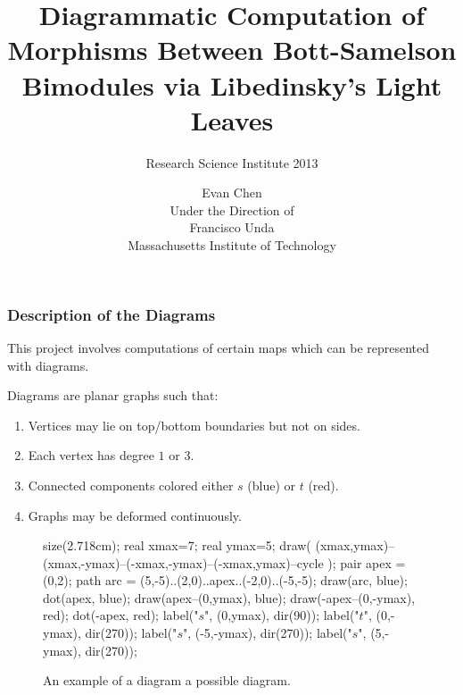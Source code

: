 \documentclass[pdf]{beamer}
\title[Maps in $\mathcal B_{\text{BS}}$]{Diagrammatic Computation of Morphisms Between Bott-Samelson Bimodules via Libedinsky's Light Leaves}
\subtitle[RSI 2013]{Research Science Institute 2013}
\author[Evan Chen]{Evan Chen \\ Under the Direction of \\ Francisco Unda \\ Massachusetts Institute of Technology}
\def\ii{\item}
\theoremstyle{definition}
\newcommand{\dobarbell}[2]{
	\vcenter{\hbox{%
		\texttt{[image: barbell/\#2.pdf]}
	}}
}
\newcommand{\barbell}[1]{
	\mathchoice%
	{\dobarbell{1.6}{#1}}
	{\dobarbell{1.2}{#1}}
	{\dobarbell{0.9}{#1}}
	{\dobarbell{0.9}{#1}}
}
\begin{document}
\begin{frame}
	\maketitle
\end{frame}


\begin{frame}[fragile]
	\frametitle{Description of the Diagrams}
	This project involves computations of certain maps which can be represented with diagrams.
\end{frame}

\begin{frame}[fragile]
	Diagrams are \alert{planar graphs} such that:
	\begin{enumerate}
		\ii Vertices may lie on top/bottom boundaries but not on sides.
		\ii Each vertex has degree $1$ or $3$.
		\ii Connected components colored either $s$ (blue) or $t$ (red).
		\ii Graphs may be deformed continuously.
	\end{enumerate}
	\begin{figure}[ht]
		\centering
		\begin{asy}
		size(2.718cm);
		real xmax=7;
		real ymax=5;
		draw( (xmax,ymax)--(xmax,-ymax)--(-xmax,-ymax)--(-xmax,ymax)--cycle );
		pair apex = (0,2);
		path arc = (5,-5)..(2,0)..apex..(-2,0)..(-5,-5);
		draw(arc, blue);
		dot(apex, blue);
		draw(apex--(0,ymax), blue);
		draw(-apex--(0,-ymax), red);
		dot(-apex, red);
		label("$s$", (0,ymax), dir(90));
		label("$t$", (0,-ymax), dir(270));
		label("$s$", (-5,-ymax), dir(270));
		label("$s$", (5,-ymax), dir(270));
		\end{asy}
		\caption{An example of a diagram a possible diagram.}
	\end{figure}
\end{frame}

\end{document}
